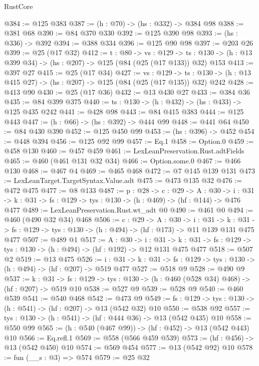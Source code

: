 \begin{lexlean}{RustCore}
\begin{coremodule}
@384 := @125 @383
@387 := (h : @70) -> (hs : @332) -> @384 @98
@388 := @381 @68
@390 := @84 @370 @330
@392 := @125 @390 @98
@393 := (hs : @336) -> @392
@394 := @388 @334
@396 := @125 @90 @98
@397 := @203 @26
@399 := @25 (@17 @32)
@412 := {t : @80} ->
  {vs : @129} ->
  {ts : @130} -> (h : @13 @399 @34) -> (hs : @207) -> @125 (@84 (@25 (@17 @133)) @32) @153
@413 := @397 @27
@415 := @25 (@17 @34)
@427 := {vs : @129} ->
  {ts : @130} -> (h : @13 @415 @27) -> (hs : @207) -> @125 (@84 (@25 (@17 @135)) @32) @242
@428 := @413 @90
@430 := @25 (@17 @36)
@432 := @13 @430 @27
@433 := @384 @36
@435 := @84 @399 @375
@440 := {ts : @130} -> (h : @432) -> (hs : @433) -> @125 @435 @242
@441 := @428 @98
@443 := @84 @415 @383
@444 := @125 @443
@447 := (h : @66) -> (hs : @392) -> @444 @99
@448 := @441 @64
@450 := @84 @430 @390
@452 := @125 @450 @99
@453 := (hs : @396) -> @452
@454 := @448 @394
@456 := @125 @92 @99
@457 := Eq.{1}
@458 := Option.{0}
@459 := @458 @130
@460 := @457 @459
@461 := LexLeanPreservation.Rust.adtFields
@465 := @460 (@461 @131 @32 @34)
@466 := Option.some.{0}
@467 := @466 @130
@468 := @467 @4
@469 := @465 @468
@472 := @7 @145 @139 @131
@473 := LexLeanTarget.TargetSyntax.Value.adt
@475 := @473 @135 @32
@476 := @472 @475
@477 := @8 @133
@487 := {p : @28} ->
  {c : @29} ->
  {A : @30} ->
  {i : @31} -> {k : @31} -> {fs : @129} -> {tys : @130} -> (h : @469) -> (hf : @144) -> @476 @477
@489 := LexLeanPreservation.Rust.wt_adt @0
@490 := @461 @0
@494 := @460 (@490 @32 @34) @468
@506 := {c : @29} ->
  {A : @30} ->
  {i : @31} ->
  {k : @31} -> {fs : @129} -> {tys : @130} -> (h : @494) -> (hf : @173) -> @11 @139 @131 @475 @477
@507 := @489 @1
@517 := {A : @30} ->
  {i : @31} ->
  {k : @31} -> {fs : @129} -> {tys : @130} -> (h : @494) -> (hf : @192) -> @12 @131 @475 @477
@518 := @507 @2
@519 := @13 @475
@526 := {i : @31} ->
  {k : @31} -> {fs : @129} -> {tys : @130} -> (h : @494) -> (hf : @207) -> @519 @477
@527 := @518 @9
@528 := @490 @9
@537 := {k : @31} ->
  {fs : @129} -> {tys : @130} -> (h : @460 (@528 @34) @468) -> (hf : @207) -> @519 @10
@538 := @527 @9
@539 := @528 @9
@540 := @460 @539
@541 := @540 @468
@542 := @473 @9
@549 := {fs : @129} -> {tys : @130} -> (h : @541) -> (hf : @207) -> @13 (@542 @32) @10
@550 := @538 @92
@557 := {tys : @130} -> (h : @541) -> (hf : @444 @36) -> @13 (@542 @435) @10
@558 := @550 @99
@565 := (h : @540 (@467 @99)) -> (hf : @452) -> @13 (@542 @443) @10
@566 := Eq.refl.{1}
@569 := @558 (@566 @459 @539)
@573 := (hf : @456) -> @13 (@542 @450) @10
@574 := @569 @454
@577 := @13 (@542 @92) @10
@578 := fun (__s : @3) => @574
@579 := @25 @32

\end{coremodule}
\end{lexlean}
